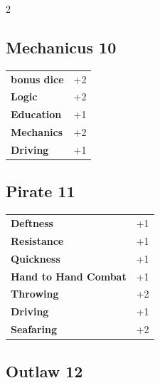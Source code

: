 \begin{multicols}{2}
\begin{tcolorbox}
    \subsection*{Mechanicus \hfill \small{10 }}
    \tcblower




\begin{tabular}{@{}ll@{}}
    \textbf{bonus dice} & +2\\
    \textbf{Logic} & +2\\
    \textbf{Education} & +1\\
    \textbf{Mechanics} & +2\\
    \textbf{Driving} & +1\\
\end{tabular}


\end{tcolorbox}

\begin{tcolorbox}
    \subsection*{Pirate \hfill \small{11 }}
    \tcblower




\begin{tabular}{@{}ll@{}}
    \textbf{Deftness} & +1\\
    \textbf{Resistance} & +1\\
    \textbf{Quickness} & +1\\
    \textbf{Hand to Hand Combat} & +1\\
    \textbf{Throwing} & +2\\
    \textbf{Driving} & +1\\
    \textbf{Seafaring} & +2\\
\end{tabular}


\end{tcolorbox}

\begin{tcolorbox}
    \subsection*{Outlaw \hfill \small{12 }}
    \tcblower





\end{tcolorbox}
\end{multicols}
